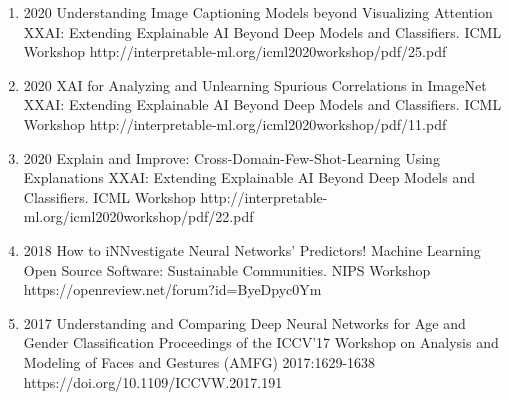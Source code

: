 \documentclass[10pt,a4paper]{article} %
\begin{document}
{\begin{enumerate}
        \item {}
                                {2020}
                                {Understanding Image Captioning Models beyond Visualizing Attention}
                                {XXAI: Extending Explainable AI Beyond Deep Models and Classifiers. ICML Workshop}
                                {}
                                {http://interpretable-ml.org/icml2020workshop/pdf/25.pdf}


        \item {}
                                {2020}
                                {XAI for Analyzing and Unlearning Spurious Correlations in ImageNet}
                                {XXAI: Extending Explainable AI Beyond Deep Models and Classifiers. ICML Workshop}
                                {}
                                {http://interpretable-ml.org/icml2020workshop/pdf/11.pdf}


        \item {}
                                {2020}
                                {Explain and Improve: Cross-Domain-Few-Shot-Learning Using Explanations}
                                {XXAI: Extending Explainable AI Beyond Deep Models and Classifiers. ICML Workshop}
                                {}
                                {http://interpretable-ml.org/icml2020workshop/pdf/22.pdf}


        \item {}
                                {2018}
                                {How to iNNvestigate Neural Networks' Predictors!}
                                {Machine Learning Open Source Software: Sustainable Communities. NIPS Workshop}
                                {}
                                {https://openreview.net/forum?id=ByeDpyc0Ym}


        \item {}
                                {2017}
                                {Understanding and Comparing Deep Neural Networks for Age and Gender Classification}
                                {Proceedings of the ICCV'17 Workshop on Analysis and Modeling of Faces and Gestures (AMFG)}
                                {2017:1629-1638}
                                {https://doi.org/10.1109/ICCVW.2017.191}


\end{enumerate}}
\end{document}
